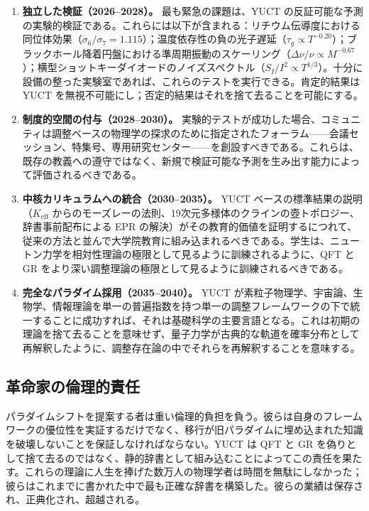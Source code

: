 \documentclass[12pt,a4paper]{article}
\begin{document}
	\begin{enumerate}
		\item \textbf{独立した検証（2026–2028）。} 最も緊急の課題は、YUCT の反証可能な予測の実験的検証である。これらには以下が含まれる：リチウム伝導度における同位体効果（\(\sigma_6/\sigma_7 = 1.115\)）；温度依存性の負の光子遅延（\(\tau_g \propto T^{-0.20}\)）；ブラックホール降着円盤における準周期振動のスケーリング（\(\Delta\nu/\nu \propto M^{-0.67}\)）；横型ショットキーダイオードのノイズスペクトル（\(S_I/I^2 \propto T^{1/3}\)）。十分に設備の整った実験室であれば、これらのテストを実行できる。肯定的結果は YUCT を無視不可能にし；否定的結果はそれを捨て去ることを可能にする。
		
		\item \textbf{制度的空間の付与（2028–2030）。} 実験的テストが成功した場合、コミュニティは調整ベースの物理学の探求のために指定されたフォーラム——会議セッション、特集号、専用研究センター——を創設すべきである。これらは、既存の教義への遵守ではなく、新規で検証可能な予測を生み出す能力によって評価されるべきである。
		
		\item \textbf{中核カリキュラムへの統合（2030–2035）。} YUCT ベースの標準結果の説明（\(K_{\mathrm{eff}}\) からのモーズレーの法則、19次元多様体のクラインの壺トポロジー、辞書事前配布による EPR の解決）がその教育的価値を証明するにつれて、従来の方法と並んで大学院教育に組み込まれるべきである。学生は、ニュートン力学を相対性理論の極限として見るように訓練されるように、QFT と GR をより深い調整理論の極限として見るように訓練されるべきである。
		
		\item \textbf{完全なパラダイム採用（2035–2040）。} YUCT が素粒子物理学、宇宙論、生物学、情報理論を単一の普遍指数を持つ単一の調整フレームワークの下で統一することに成功すれば、それは基礎科学の主要言語となる。これは初期の理論を捨て去ることを意味せず、量子力学が古典的な軌道を確率分布として再解釈したように、調整存在論の中でそれらを再解釈することを意味する。
	\end{enumerate}
	
	\subsection{革命家の倫理的責任}
	
	パラダイムシフトを提案する者は重い倫理的負担を負う。彼らは自身のフレームワークの優位性を実証するだけでなく、移行が旧パラダイムに埋め込まれた知識を破壊しないことを保証しなければならない。YUCT は QFT と GR を偽りとして捨て去るのではなく、静的辞書として組み込むことによってこの責任を果たす。これらの理論に人生を捧げた数万人の物理学者は時間を無駄にしなかった；彼らはこれまでに書かれた中で最も正確な辞書を構築した。彼らの業績は保存され、正典化され、超越される。
	
\end{document}
